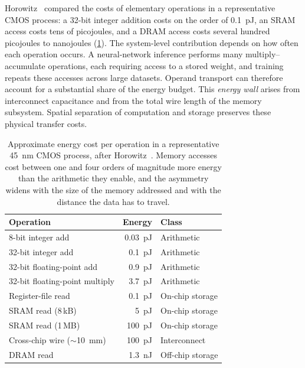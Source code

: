 \documentclass[12pt, twoside]{report}
\begin{document}
Horowitz~\cite{Horowitz2014} compared the costs of elementary operations in a representative CMOS process: a 32-bit integer addition costs on the order of \SI{0.1}{\pico\joule}, an SRAM access costs tens of picojoules, and a DRAM access costs several hundred picojoules to nanojoules (\cref{tab:energy_per_op}). The system-level contribution depends on how often each operation occurs. A neural-network inference performs many multiply--accumulate operations, each requiring access to a stored weight, and training repeats these accesses across large datasets. Operand transport can therefore account for a substantial share of the energy budget. This \textit{energy wall} arises from interconnect capacitance and from the total wire length of the memory subsystem. Spatial separation of computation and storage preserves these physical transfer costs.

\begin{table}[!htb]
  \centering
  \caption[Energy cost per operation in a 45\,nm CMOS process]{Approximate energy cost per operation in a representative \SI{45}{\nano\metre} CMOS process, after Horowitz~\cite{Horowitz2014}. Memory accesses cost between one and four orders of magnitude more energy than the arithmetic they enable, and the asymmetry widens with the size of the memory addressed and with the distance the data has to travel.}\label{tab:energy_per_op}
  \footnotesize
  \begin{tabular}{lrl}
    \toprule
    \textbf{Operation} & \textbf{Energy} & \textbf{Class} \\
    \midrule
    8-bit integer add                                         & \SI{0.03}{\pico\joule} & Arithmetic       \\
    32-bit integer add                                        & \SI{0.1}{\pico\joule}  & Arithmetic       \\
    32-bit floating-point add                                 & \SI{0.9}{\pico\joule}  & Arithmetic       \\
    32-bit floating-point multiply                            & \SI{3.7}{\pico\joule}  & Arithmetic       \\
    Register-file read                                        & \SI{0.1}{\pico\joule}  & On-chip storage  \\
    SRAM read (8\,kB)                                         & \SI{5}{\pico\joule}    & On-chip storage  \\
    SRAM read (1\,MB)                                         & \SI{100}{\pico\joule}  & On-chip storage  \\
    Cross-chip wire (\(\sim\)\SI{10}{\milli\metre})           & \SI{100}{\pico\joule}  & Interconnect     \\
    DRAM read                                                 & \SI{1.3}{\nano\joule}  & Off-chip storage \\
    \bottomrule
  \end{tabular}
\end{table}
\end{document}

